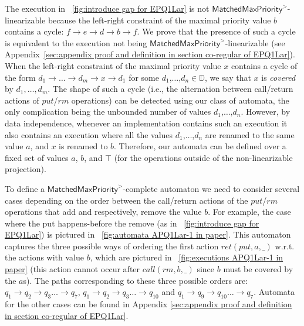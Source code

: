 The execution in \figurename~\ref{fig:introduce gap for EPQ1Lar} is not $\mathsf{MatchedMaxPriority}^>$-linearizable because the left-right constraint of the maximal priority value $b$ contains a cycle: $f \rightarrow e \rightarrow d \rightarrow b \rightarrow f$. We prove that the presence of such a cycle is equivalent to the execution not being $\mathsf{MatchedMaxPriority}^>$-linearizable (see Appendix~\ref{sec:appendix proof and definition in section co-regular of EPQ1Lar}).
When the left-right constraint of the maximal priority value $x$ contains a cycle of the form $d_1 \rightarrow \ldots \rightarrow d_m \rightarrow x \rightarrow d_1$ for some $d_1$,$\ldots$,$d_n\in \mathbb{D}$, we say that $x$ is \emph{covered} by $d_1,\ldots,d_m$. The shape of such a cycle (i.e., the alternation between call/return actions of $\textit{put}$/$\textit{rm}$ operations) can be detected using our class of automata, the only complication being the unbounded number of values $d_1$,$\ldots$,$d_n$. However, by data independence, whenever an implementation contains such an execution it also contains an execution where all the values $d_1$,$\ldots$,$d_n$ are renamed to the same value $a$, and $x$ is renamed to $b$. Therefore, our automata can be defined over a fixed set of values $a$, $b$, and $\top$ (for the operations outside of the non-linearizable projection).

To define a $\mathsf{MatchedMaxPriority}^>$-complete automaton we need to consider several cases depending on the order between the call/return actions of the $\textit{put}$/$\textit{rm}$ operations that add and respectively, remove the value $b$. For example, the case where the put happens-before the remove (as in \figurename~\ref{fig:introduce gap for EPQ1Lar}) is pictured in \figurename~\ref{fig:automata APQ1Lar-1 in paper}. This automaton captures the three possible ways of ordering the first action $\textit{ret}(\textit{put},a,\_)$ w.r.t. the actions with value $b$, which are pictured in \figurename~\ref{fig:executions APQ1Lar-1 in paper} (this action cannot occur after $\textit{call}(\textit{rm},b,\_)$ since $b$ must be covered by the $a$s). The paths corresponding to these three possible orders are: $q_1 \rightarrow q_2 \rightarrow q_3 \ldots \rightarrow q_7$, $q_1 \rightarrow q_2 \rightarrow q_3 \ldots \rightarrow q_{10}$ and $q_1 \rightarrow q_9 \rightarrow q_{10} \ldots \rightarrow q_7$. Automata for the other cases can be found in Appendix \ref{sec:appendix proof and definition in section co-regular of EPQ1Lar}. 


